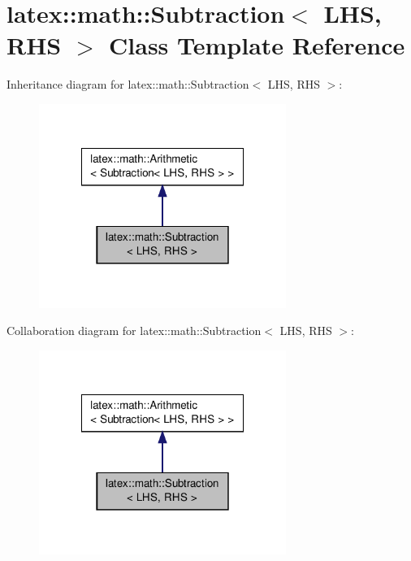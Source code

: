 \hypertarget{classlatex_1_1math_1_1Subtraction}{\section{latex\-:\-:math\-:\-:Subtraction$<$ L\-H\-S, R\-H\-S $>$ Class Template Reference}
\label{classlatex_1_1math_1_1Subtraction}
}


Inheritance diagram for latex\-:\-:math\-:\-:Subtraction$<$ L\-H\-S, R\-H\-S $>$\-:
\nopagebreak
\begin{figure}[H]
\begin{center}
\leavevmode
\includegraphics[width=228pt]{classlatex_1_1math_1_1Subtraction__inherit__graph}
\end{center}
\end{figure}


Collaboration diagram for latex\-:\-:math\-:\-:Subtraction$<$ L\-H\-S, R\-H\-S $>$\-:
\nopagebreak
\begin{figure}[H]
\begin{center}
\leavevmode
\includegraphics[width=228pt]{classlatex_1_1math_1_1Subtraction__coll__graph}
\end{center}
\end{figure}
